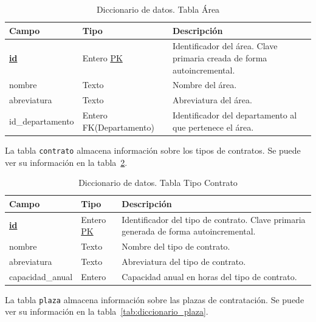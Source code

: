 \begin{table}
  \centering 
  \begin{tabular}{l p{} p{}}
    \toprule
    \textbf{Campo} & \textbf{Tipo} & \textbf{Descripción}\\
    \midrule
    \textbf{\underline{id}} & Entero \underline{PK} & Identificador del área. Clave primaria creada de forma autoincremental. \\ \addlinespace
    nombre & Texto & Nombre del área. \\ \addlinespace
    abreviatura & Texto & Abreviatura del área. \\ \addlinespace
    id\_departamento & Entero FK(Departamento) & Identificador del departamento al que pertenece el área. \\
    \bottomrule
  \end{tabular}
  \caption{Diccionario de datos. Tabla Área}
  \label{tab:diccionario_area}
\end{table}

La tabla \texttt{contrato} almacena información sobre los tipos de contratos. 
Se puede ver su información en la tabla~\ref{tab:diccionario_tipo_contrato}.

\begin{table}
  \centering 
  \begin{tabular}{l p{} p{}}
    \toprule
    \textbf{Campo} & \textbf{Tipo} & \textbf{Descripción}\\
    \midrule
    \textbf{\underline{id}} & Entero \underline{PK} & Identificador del tipo de contrato. Clave primaria generada de forma autoincremental. \\ \addlinespace
    nombre & Texto & Nombre del tipo de contrato. \\ \addlinespace
    abreviatura & Texto & Abreviatura del tipo de contrato. \\ \addlinespace
    capacidad\_anual & Entero & Capacidad anual en horas del tipo de contrato. \\
    \bottomrule
  \end{tabular}
  \caption{Diccionario de datos. Tabla Tipo Contrato}
  \label{tab:diccionario_tipo_contrato}
\end{table}

La tabla \texttt{plaza} almacena información sobre las plazas de contratación. 
Se puede ver su información en la tabla~\ref{tab:diccionario_plaza}.

